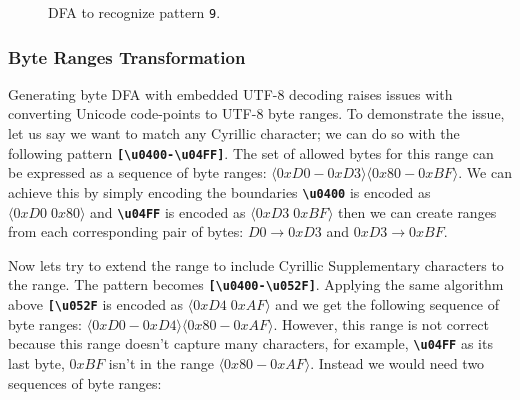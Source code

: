 \begin{figure}[htbp]
\centering
\begin{adjustbox}{width=1.1\textwidth,center=\textwidth}
\end{adjustbox}
\caption{DFA to recognize pattern \texttt{9\textvisiblespace \textsterling}.}
\label{fig:utf8exdfa}
\end{figure}


\subsubsection{Byte Ranges Transformation}

Generating byte DFA with embedded UTF-8 decoding raises issues with converting Unicode code-points to UTF-8 byte ranges. To demonstrate the issue, let us say we want to match any Cyrillic character; we can do so with the following pattern \texttt{\textbf{[\textbackslash u0400-\textbackslash u04FF]}}. The set of allowed bytes for this range can be expressed as a sequence of byte ranges: $\langle0xD0-0xD3\rangle \langle0x80-0xBF\rangle$. We can achieve this by simply encoding the boundaries \texttt{\textbf{\textbackslash u0400}} is encoded as $\langle0xD0 \; 0x80\rangle$ and \texttt{\textbf{\textbackslash u04FF}} is encoded as $\langle0xD3 \; 0xBF\rangle$ then we can create ranges from each corresponding pair of bytes: $D0 \rightarrow 0xD3$ and $0xD3 \rightarrow 0xBF$.

Now lets try to extend the range to include Cyrillic Supplementary characters to the range. The pattern becomes \texttt{\textbf{[\textbackslash u0400-\textbackslash u052F]}}. Applying the same algorithm above \texttt{\textbf{[\textbackslash u052F}} is encoded as $\langle0xD4 \; 0xAF\rangle$ and we get the following sequence of byte ranges: $\langle0xD0-0xD4\rangle \langle0x80-0xAF\rangle$. However, this range is not correct because this range doesn't capture many characters, for example, \texttt{\textbf{\textbackslash u04FF}} as its last byte, $0xBF$ isn't in the range $\langle0x80-0xAF\rangle$. Instead we would need two sequences of byte ranges:


